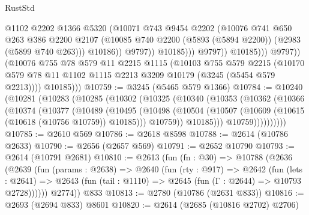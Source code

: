 \begin{lexlean}{RustStd}
\begin{coremodule}
                                @1102
                                @2202
                                @1366
                                @5320
                                (@10071
                                  @743
                                  @9454
                                  @2202
                                  (@10076
                                    @741
                                    @650
                                    @263
                                    @386
                                    @2200
                                    @2107
                                    (@10085
                                      @740
                                      @2200
                                      (@5893 (@5894 @2200))
                                      (@2983 (@5899 @740 @263)))
                                    @10186))
                                @9797))
                            @10185)))
                      @9797))
                  @10185)))
            @9797))
        (@10076
          @755
          @78
          @579
          @11
          @2215
          @1115
          (@10103
            @755
            @579
            @2215
            (@10170 @579 @78 @11 @1102 @1115 @2213 @3209 @10179 (@3245 (@5454 @579 @2213))))
          @10185)))
@10759 := @3245 (@5465 @579 @1366)
@10784 := @10240
    (@10281
      (@10283
        (@10285
          (@10302
            (@10325
              (@10340
                (@10353
                  (@10362
                    (@10366
                      (@10374
                        (@10377
                          (@10489
                            (@10495
                              (@10498
                                (@10504
                                  (@10507 (@10609 (@10615 (@10618 (@10756 @10759)) @10185)))
                                  @10759))
                              @10185)))
                        @10759))))))))))
@10785 := @2610 @569
@10786 := @2618 @8598
@10788 := @2614 (@10786 @2633)
@10790 := @2656 (@2657 @569)
@10791 := @2652 @10790
@10793 := @2614 (@10791 @2681)
@10810 := @2613
    (fun (fn : @30) =>
    @10788
      (@2636
        (@2639
          (fun (params : @2638) =>
          @2640
            (fun (rty : @917) =>
            @2642
              (fun (lets : @2641) =>
              @2643 (fun (tail : @1110) => @2645 (fun (Γ : @2644) => @10793 @2728))))))
        @2774))
    @833
@10813 := @2780 (@10786 (@2631 @833))
@10816 := @2693 (@2694 @833) @8601
@10820 := @2614 (@2685 (@10816 @2702) @2706)

\end{coremodule}
\end{lexlean}
